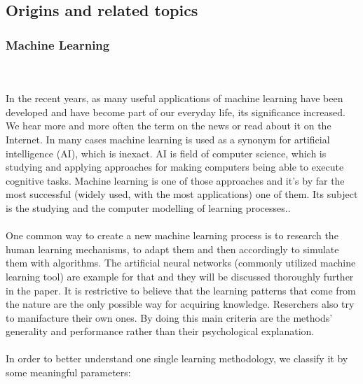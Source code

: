 \documentclass[runningheads,a4paper]{llncs}[2015/06/24]
\begin{document}
	\subsection{Origins and related topics}
		\subsubsection{Machine Learning}\hspace{1cm}\\\\ 
In the recent years, as many useful applications of machine learning have been developed and have become part of our everyday life, its significance increased. We hear more and more often the term on the news or read about it on the Internet. In many cases machine learning is used as a synonym for artificial intelligence (AI), which is inexact. AI is field of computer science, which is studying and  applying approaches for making computers being able to execute cognitive tasks\cite{AIvsML}. Machine learning is one of those approaches and it's by far the most successful (widely used, with the most applications) one of them\cite{quinlan1986induction}. Its subject is the studying and the computer modelling of learning processes.\cite{Michalski1983}. \\\\ One common way to create a new machine learning process is to research the human learning mechanisms, to adapt them and then accordingly to simulate them  with algorithms. The artificial neural networks (commonly utilized machine learning tool) are example for that and they will be discussed thoroughly further in the paper. It is  restrictive to believe that the learning patterns that come from the nature are the only possible way for acquiring knowledge. Reserchers also try to manifacture their own ones. By doing this main criteria are the methods'  generality and performance rather than their psychological explanation\cite{Michalski1983}.\\\\ 
In order to better understand one single learning methodology, we classify it by some meaningful parameters:
\end{document}
